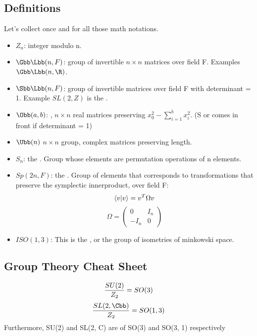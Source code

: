 \documentclass[11pt]{scrartcl}
\begin{document}
\subsection{Definitions}
Let's collect once and for all those math notations.
\begin{itemize}
	\item $Z_n$: integer modulo n.
	\item $\Gbb \Lbb(n, F)$:  group of invertible $n \times n$ matrices over field F.  Examples
	$\Gbb \Lbb(n, \R)$.
	\item $\Sbb \Lbb(n, F)$:  group of invertible matrices over field F with determinant = 1.
	Example $SL(2, Z)$ is the .
	\item $\Obb(a, b)$: , $n \times n$ real matrices preserving
	$x_0^2 - \sum_{i=1}^b x_i^2$.  (S or  comes in front if determinant = 1)
	\item  $\Ubb(n)$ $n \times n$  group, complex matrices preserving length.
	\item $S_n$: the .  Group whose elements are permutation operations of n elements.
	\item $Sp(2n, F)$: the .  Group of elements that corresponds to transformations that preserve the symplectic innerproduct, over field F:
	\[ \braket{v|v} = v^T \Omega v \]
	\[ \Omega = 
	\left( \begin{array}{cc} 
		0 & I_n \\
		-I_n & 0
	\end{array} \right) \]
	
	\item $ISO(1, 3)$:  This is the , or the group of isometries of minkowski space.
\end{itemize}

\subsection{Group Theory Cheat Sheet}

\begin{lemma}
	\[ {SU(2) \over Z_2} = SO(3) \]
	\[ {SL(2, \Cbb) \over Z_2} =  SO(1, 3) \]
	Furthermore, SU(2) and SL(2, C) are  of SO(3) and SO(3, 1) respectively
\end{lemma}
\end{document}

